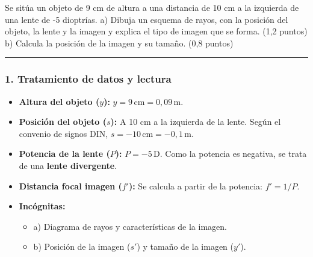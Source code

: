 \begin{cajaenunciado}
Se sitúa un objeto de 9 cm de altura a una distancia de 10 cm a la izquierda de una lente de -5 dioptrías.
a) Dibuja un esquema de rayos, con la posición del objeto, la lente y la imagen y explica el tipo de imagen que se forma. (1,2 puntos) 
b) Calcula la posición de la imagen y su tamaño. (0,8 puntos) 
\end{cajaenunciado}
\hrule

\subsubsection*{1. Tratamiento de datos y lectura}
\begin{itemize}
    \item \textbf{Altura del objeto ($y$):} $y = 9\,\text{cm} = 0,09\,\text{m}$.
    \item \textbf{Posición del objeto ($s$):} A 10 cm a la izquierda de la lente. Según el convenio de signos DIN, $s = -10\,\text{cm} = -0,1\,\text{m}$.
    \item \textbf{Potencia de la lente ($P$):} $P = -5\,\text{D}$. Como la potencia es negativa, se trata de una \textbf{lente divergente}.
    \item \textbf{Distancia focal imagen ($f'$):} Se calcula a partir de la potencia: $f' = 1/P$.
    \item \textbf{Incógnitas:}
        \begin{itemize}
            \item a) Diagrama de rayos y características de la imagen.
            \item b) Posición de la imagen ($s'$) y tamaño de la imagen ($y'$).
        \end{itemize}
\end{itemize}


